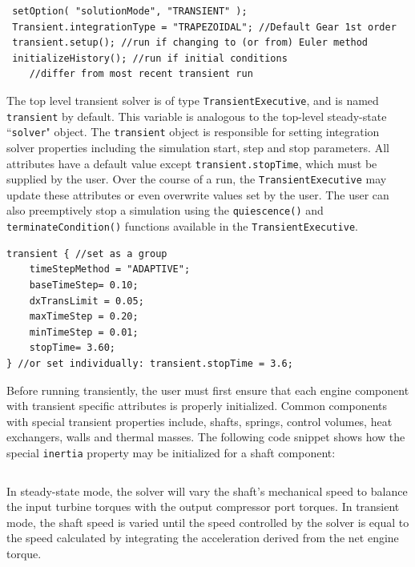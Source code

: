 \documentclass[heading.tex]{subfiles}
\begin{document}
\begin{adjustwidth}{-0.5cm}{-0.5cm}
 \begin{verbatim}
 setOption( "solutionMode", "TRANSIENT" );
 Transient.integrationType = "TRAPEZOIDAL"; //Default Gear 1st order
 transient.setup(); //run if changing to (or from) Euler method
 initializeHistory(); //run if initial conditions 
 	//differ from most recent transient run
 \end{verbatim}
 \end{adjustwidth} 
       

The top level transient solver is of type \texttt{TransientExecutive}, and is named
\texttt{transient} by default. This variable is analogous to the top-level steady-state 
``\texttt{solver}" object. The \texttt{transient} object is responsible for setting integration
solver properties including the simulation start, step and stop parameters. \cite[chap.~7.5]{NPSS}
\cite[chap.~15.1.8]{NPSS}  All attributes have a default value except \texttt{transient.stopTime},
which must be supplied by the user. Over the course of a run, the \texttt{TransientExecutive} may
update these attributes or even overwrite values set by the user. The user can also preemptively
stop a simulation using the  \texttt{quiescence()} and  \texttt{terminateCondition()} functions
available in the \texttt{TransientExecutive}.

\begin{adjustwidth}{0cm}{0cm}
 \begin{verbatim}
transient { //set as a group
	timeStepMethod = "ADAPTIVE";
	baseTimeStep= 0.10;
	dxTransLimit = 0.05;
	maxTimeStep = 0.20;
	minTimeStep = 0.01;
	stopTime= 3.60;
} //or set individually: transient.stopTime = 3.6;
 \end{verbatim}
 \end{adjustwidth} 

Before running transiently, the user must first ensure that each engine component with transient
specific attributes is properly initialized. Common components with special transient properties
include, shafts, springs, control volumes, heat exchangers, walls and thermal masses.
The following code snippet shows how the special \texttt{inertia} property may be initialized
for a shaft component:

 \begin{adjustwidth}{-1cm}{-1cm}
 \inputminted[]{c++}{code/shaft.mdl}
 \end{adjustwidth} 

In steady-state mode, the solver will vary the shaft's mechanical speed to
balance the input turbine torques with the output compressor port torques.
In transient mode, the shaft speed is varied until the speed
controlled by the solver is equal to the speed calculated by integrating
the acceleration derived from the net engine torque.
\end{document}
